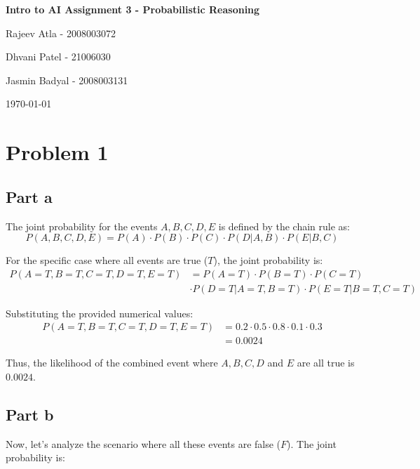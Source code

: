 \documentclass[12pt]{article}
\begin{document}
\begin{center}
    \Large
    \sffamily 
    \textbf{Intro to AI Assignment 3 - Probabilistic Reasoning}

    \vspace{0.5cm}

    \large
    {Rajeev Atla -
    2008003072\\}
    
    {Dhvani Patel -
    21006030\\}
    
    {Jasmin Badyal -
    2008003131\\}

    \vspace{0.5cm}

    \today
\end{center}

\section{Problem 1}

\subsection{Part a}

The joint probability for the events $A, B, C, D, E$ 
is defined by the chain rule as:
$$P(A, B, C, D, E) = P(A) \cdot P(B) \cdot P(C) \cdot P(D|A, B) \cdot P(E|B, C)$$

For the specific case where all events are true ($T$), 
the joint probability is:
\begin{align*}
    P(A=T, B=T, C=T, D=T, E=T) &= P(A=T) \cdot P(B=T) \cdot P(C=T) \\
    & \cdot P(D=T|A=T, B=T) \cdot P(E=T|B=T, C=T)
\end{align*}

Substituting the provided numerical values:
\begin{align*}
P(A=T, B=T, C=T, D=T, E=T) &= 0.2 \cdot 0.5 \cdot 0.8 \cdot 0.1 \cdot 0.3 \\
&= 0.0024
\end{align*}

Thus, 
the likelihood of the combined event where 
$A, B, C, D$ and $E$ are all true is $\boxed{0.0024}$.

\subsection{Part b}

Now, 
let's analyze the scenario where all these events are false ($F$). 
The joint probability is:
\end{document}
